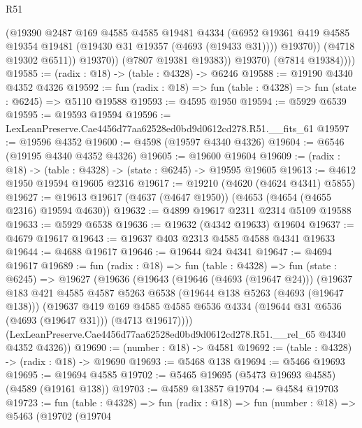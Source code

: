 \begin{lexlean}{R51}
\begin{coremodule}
                      (@19390
                        @2487
                        @169
                        @4585
                        @4585
                        @19481
                        @4334
                        (@6952
                          @19361
                          @419
                          @4585
                          @19354
                          @19481
                          (@19430 @31 @19357 (@4693 (@19433 @31))))
                        @19370))
                    (@4718 @19302 @6511))
                  @19370))
              (@7807 @19381 @19383))
            @19370)
          (@7814 @19384))))
@19585 := (radix : @18) -> (table : @4328) -> @6246
@19588 := @19190 @4340 @4352 @4326
@19592 := fun (radix : @18) => fun (table : @4328) => fun (state : @6245) => @5110 @19588
@19593 := @4595 @1950
@19594 := @5929 @6539
@19595 := @19593 @19594
@19596 := LexLeanPreserve.Cae4456d77aa62528ed0bd9d0612cd278.R51.__fits_61
@19597 := @19596 @4352
@19600 := @4598 (@19597 @4340 @4326)
@19604 := @6546 (@19195 @4340 @4352 @4326)
@19605 := @19600 @19604
@19609 := (radix : @18) -> (table : @4328) -> (state : @6245) -> @19595 @19605
@19613 := @4612 @1950 @19594 @19605 @2316
@19617 := @19210 (@4620 (@4624 @4341) @5855)
@19627 := @19613 @19617 (@4637 (@4647 @1950)) (@4653 (@4654 (@4655 @2316) @19594 @4630))
@19632 := @4899 @19617 @2311 @2314 @5109 @19588
@19633 := @5929 @6538
@19636 := @19632 (@4342 @19633) @19604
@19637 := @4679 @19617
@19643 := @19637 @403 @2313 @4585 @4588 @4341 @19633
@19644 := @4688 @19617
@19646 := @19644 @24 @4341
@19647 := @4694 @19617
@19689 := fun (radix : @18) =>
  fun (table : @4328) =>
  fun (state : @6245) =>
  @19627
    (@19636
      (@19643
        (@19646 (@4693 (@19647 @24)))
        (@19637
          @183
          @421
          @4585
          @4587
          @5263
          @6538
          (@19644 @138 @5263 (@4693 (@19647 @138)))
          (@19637
            @419
            @169
            @4585
            @4585
            @6536
            @4334
            (@19644 @31 @6536 (@4693 (@19647 @31)))
            (@4713 @19617))))
      (LexLeanPreserve.Cae4456d77aa62528ed0bd9d0612cd278.R51.__rel_65 @4340 @4352 @4326))
@19690 := (number : @18) -> @4581
@19692 := (table : @4328) -> (radix : @18) -> @19690
@19693 := @5468 @138
@19694 := @5466 @19693
@19695 := @19694 @4585
@19702 := @5465 @19695 (@5473 @19693 @4585) (@4589 (@19161 @138))
@19703 := @4589 @13857
@19704 := @4584 @19703
@19723 := fun (table : @4328) =>
  fun (radix : @18) =>
  fun (number : @18) =>
  @5463
    (@19702
      (@19704

\end{coremodule}
\end{lexlean}
